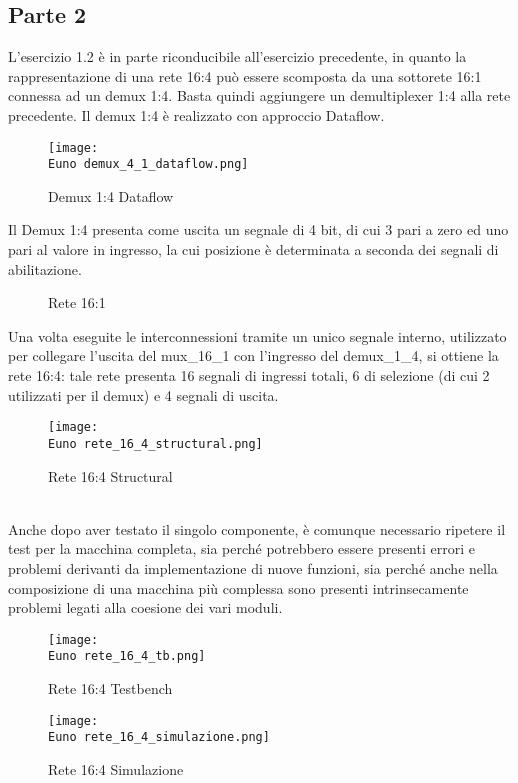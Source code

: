 \documentclass[12pt]{article}
\def \Euno {Allegati/Esercizio1/}
\begin{document}
\subsection{Parte 2}
L’esercizio 1.2 è in parte riconducibile all’esercizio precedente, in quanto la rappresentazione di una rete 16:4 può essere scomposta da una sottorete 16:1 connessa ad un demux 1:4. Basta quindi aggiungere un demultiplexer 1:4 alla rete precedente. Il demux 1:4 è realizzato con approccio Dataflow.
\begin{figure}[ht]
    \centering
    \texttt{[image: \\Euno demux\_4\_1\_dataflow.png]}
    \caption{Demux 1:4 Dataflow}
\end{figure}
\newline Il Demux 1:4 presenta come uscita un segnale di 4 bit, di cui 3 pari a zero ed uno pari al valore in ingresso, la cui posizione è determinata a seconda dei segnali di abilitazione.
\begin{figure}[ht]
    \centering
    
    \caption{Rete 16:1}
\end{figure}
\newpage
Una volta eseguite le interconnessioni tramite un unico segnale interno, utilizzato per collegare l’uscita del mux\_16\_1 con l’ingresso del demux\_1\_4, si ottiene la rete 16:4:  tale rete presenta 16 segnali di ingressi totali, 6 di selezione (di cui 2 utilizzati per il demux) e 4 segnali di uscita.
\begin{figure}[ht]
    \centering
    \texttt{[image: \\Euno rete\_16\_4\_structural.png]}
    \caption{Rete 16:4 Structural}
\end{figure}
\\
Anche dopo aver testato il singolo componente, è comunque necessario ripetere il test per la macchina completa, sia perché potrebbero essere presenti errori e problemi derivanti da implementazione di nuove funzioni, sia perché anche nella composizione di una macchina più complessa sono presenti intrinsecamente problemi legati alla coesione dei vari moduli.
\newpage
\begin{figure}[ht]
    \centering
    \texttt{[image: \\Euno rete\_16\_4\_tb.png]}
    \caption{Rete 16:4 Testbench}
\end{figure}

\begin{figure}[ht!]
    \centering
    \texttt{[image: \\Euno rete\_16\_4\_simulazione.png]}
    \caption{Rete 16:4 Simulazione}
\end{figure}
\newpage
\end{document}
